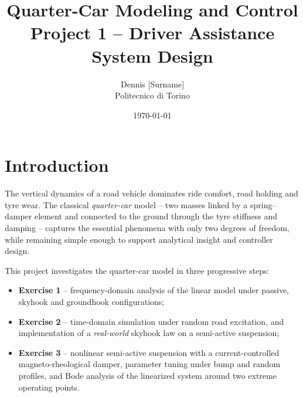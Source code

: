 %
%

\title{Quarter-Car Modeling and Control \\ \large Project 1 -- Driver Assistance System Design}
\author{Dennis [Surname] \\ Politecnico di Torino}
\date{\today}
\maketitle

\section{Introduction}
The vertical dynamics of a road vehicle dominates ride comfort, road
holding and tyre wear. The classical \emph{quarter-car} model -- two
masses linked by a spring--damper element and connected to the ground
through the tyre stiffness and damping -- captures the essential
phenomena with only two degrees of freedom, while remaining simple
enough to support analytical insight and controller design.

This project investigates the quarter-car model in three progressive
steps:
\begin{itemize}
    \item \textbf{Exercise 1} -- frequency-domain analysis of the
          linear model under passive, skyhook and groundhook
          configurations;
    \item \textbf{Exercise 2} -- time-domain simulation under random
          road excitation, and implementation of a
          \emph{real-world} skyhook law on a semi-active suspension;
    \item \textbf{Exercise 3} -- nonlinear semi-active suspension with
          a current-controlled magneto-rheological damper, parameter
          tuning under bump and random profiles, and Bode analysis of
          the linearized system around two extreme operating points.
\end{itemize}

